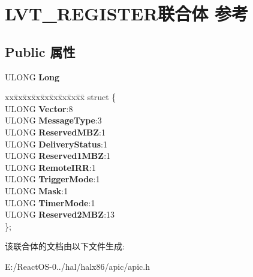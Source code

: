\hypertarget{union_l_v_t___r_e_g_i_s_t_e_r}{}\section{L\+V\+T\+\_\+\+R\+E\+G\+I\+S\+T\+E\+R联合体 参考}
\label{union_l_v_t___r_e_g_i_s_t_e_r}
\subsection*{Public 属性}
\begin{DoxyCompactItemize}
\item 
\mbox{\label{union_l_v_t___r_e_g_i_s_t_e_r_a0526e3d12c94e8f9aa85c271c82ab73a}} 
U\+L\+O\+NG {\bfseries Long}
\item 
\mbox{\label{union_l_v_t___r_e_g_i_s_t_e_r_acda01e389f43ceec14d7d6f367f848ed}} 
\begin{tabbing}
xx\=xx\=xx\=xx\=xx\=xx\=xx\=xx\=xx\=\kill
struct \{\\
\>ULONG {\bfseries Vector}:8\\
\>ULONG {\bfseries MessageType}:3\\
\>ULONG {\bfseries ReservedMBZ}:1\\
\>ULONG {\bfseries DeliveryStatus}:1\\
\>ULONG {\bfseries Reserved1MBZ}:1\\
\>ULONG {\bfseries RemoteIRR}:1\\
\>ULONG {\bfseries TriggerMode}:1\\
\>ULONG {\bfseries Mask}:1\\
\>ULONG {\bfseries TimerMode}:1\\
\>ULONG {\bfseries Reserved2MBZ}:13\\
\}; \\

\end{tabbing}\end{DoxyCompactItemize}


该联合体的文档由以下文件生成\+:\begin{DoxyCompactItemize}
\item 
E\+:/\+React\+O\+S-\/0../hal/halx86/apic/apic.\+h\end{DoxyCompactItemize}

